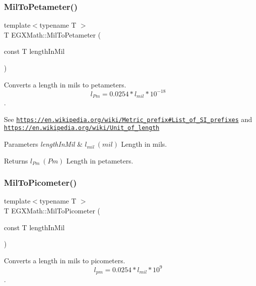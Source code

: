 \subsubsection{\texorpdfstring{Mil\+To\+Petameter()}{MilToPetameter()}}
{\footnotesize\ttfamily template$<$typename T $>$ \\
T E\+G\+X\+Math\+::\+Mil\+To\+Petameter (\begin{DoxyParamCaption}\item[{const T}]{length\+In\+Mil }\end{DoxyParamCaption})}



Converts a length in mils to petameters. \[ l_{Pm}=0.0254* l_{mil} * 10^{-18} \]. 

See \href{https://en.wikipedia.org/wiki/Metric_prefix#List_of_SI_prefixes}{\tt https\+://en.\+wikipedia.\+org/wiki/\+Metric\+\_\+prefix\#\+List\+\_\+of\+\_\+\+S\+I\+\_\+prefixes} and \href{https://en.wikipedia.org/wiki/Unit_of_length}{\tt https\+://en.\+wikipedia.\+org/wiki/\+Unit\+\_\+of\+\_\+length} 
\begin{DoxyParams}{Parameters}
{\em length\+In\+Mil} & $ l_{mil}\ (mil)$ Length in mils. \\
\hline
\end{DoxyParams}
\begin{DoxyReturn}{Returns}
$ l_{Pm}\ (Pm)$ Length in petameters. 
\end{DoxyReturn}
\mbox{\label{group___e_g_x_math-_conversions-_length_conversions-_imperial-_mil-_s_i_ga29a85f8ec2e5cf4d963468f882de8447}} 
\subsubsection{\texorpdfstring{Mil\+To\+Picometer()}{MilToPicometer()}}
{\footnotesize\ttfamily template$<$typename T $>$ \\
T E\+G\+X\+Math\+::\+Mil\+To\+Picometer (\begin{DoxyParamCaption}\item[{const T}]{length\+In\+Mil }\end{DoxyParamCaption})}



Converts a length in mils to picometers. \[ l_{pm}=0.0254* l_{mil} * 10^{9} \]. 

